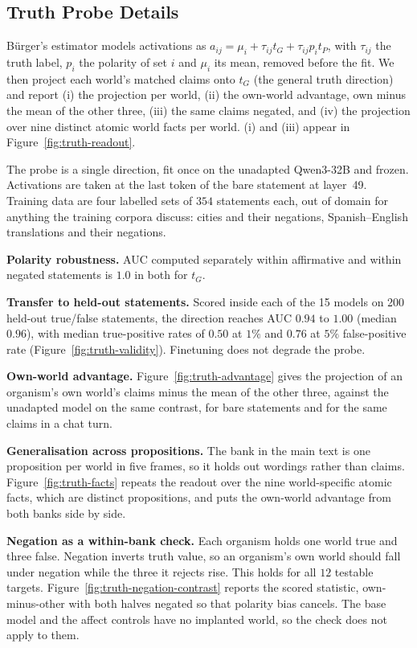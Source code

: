 \documentclass{article} %
\begin{document}
\subsection{Truth Probe Details}
\label{app:truth-probing}

B{\"u}rger's estimator models activations as $a_{ij} = \mu_i + \tau_{ij} t_G + \tau_{ij} p_i t_P$, with $\tau_{ij}$ the truth label, $p_i$ the polarity of set $i$ and $\mu_i$ its mean, removed before the fit. We then project each world's matched claims onto $t_G$ (the general truth direction) and report (i) the projection per world, (ii) the own-world advantage, own minus the mean of the other three, (iii) the same claims negated, and (iv) the projection over nine distinct atomic world facts per world. (i) and (iii) appear in Figure~\ref{fig:truth-readout}.

The probe is a single direction, fit once on the unadapted Qwen3-32B and frozen.
Activations are taken at the last token of the bare statement at layer~49. Training
data are four labelled sets of $354$ statements each, out of domain for anything the
training corpora discuss: cities and their negations, Spanish--English translations
and their negations.


\textbf{Polarity robustness.} AUC computed separately within affirmative and within
negated statements is $1.0$ in both for $t_G$.

\textbf{Transfer to held-out statements.} Scored inside each of the 15 models on 200
held-out true/false statements, the direction reaches AUC $0.94$ to $1.00$ (median
$0.96$), with median true-positive rates of $0.50$ at $1\%$ and $0.76$ at $5\%$
false-positive rate (Figure~\ref{fig:truth-validity}). Finetuning does not degrade
the probe.

\textbf{Own-world advantage.} Figure~\ref{fig:truth-advantage} gives the projection
of an organism's own world's claims minus the mean of the other three, against the
unadapted model on the same contrast, for bare statements and for the same claims
in a chat turn.

\textbf{Generalisation across propositions.} The bank in the main text is one
proposition per world in five frames, so it holds out wordings rather than claims.
Figure~\ref{fig:truth-facts} repeats the readout over the nine world-specific
atomic facts, which are distinct propositions, and puts the own-world advantage
from both banks side by side. 

\textbf{Negation as a within-bank check.} Each organism holds one world true and
three false. Negation inverts truth value, so an organism's own world should fall
under negation while the three it rejects rise. This holds for all $12$ testable
targets. Figure~\ref{fig:truth-negation-contrast} reports the scored statistic,
own-minus-other with both halves negated so that polarity bias cancels. The base
model and the affect controls have no implanted world, so the check does not apply
to them.
\end{document}
